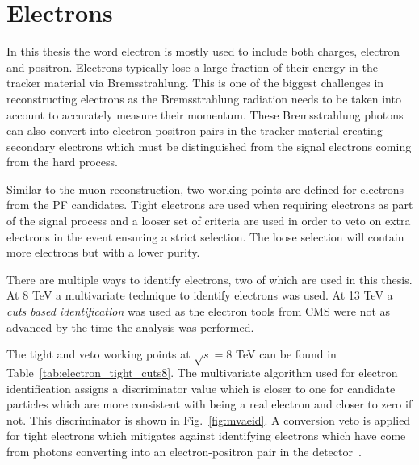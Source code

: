 \section{Electrons \label{sec:electronreco}}

In this thesis the word electron is mostly used to include both charges, electron and positron. Electrons typically lose a large fraction of their energy in the tracker material via Bremsstrahlung. This is one of the biggest challenges in reconstructing electrons as the Bremsstrahlung radiation needs to be taken into account to accurately measure their momentum. These Bremsstrahlung photons can also convert into electron-positron pairs in the tracker material creating secondary electrons which must be distinguished from the signal electrons coming from the hard process. 

Similar to the muon reconstruction, two working points are defined for electrons from the PF candidates. Tight electrons are used when requiring electrons as part of the signal process and a looser set of criteria are used in order to veto on extra electrons in the event ensuring a strict selection. The loose selection will contain more electrons but with a lower purity. 

There are multiple ways to identify electrons, two of which are used in this thesis. At 8 TeV a multivariate technique to identify electrons was used. At 13 TeV a \emph{cuts based identification} was used as the electron tools from CMS were not as advanced by the time the analysis was performed.

The tight and veto working points at $\sqrt{s}=8$ TeV can be found in Table~\ref{tab:electron_tight_cuts8}. The multivariate algorithm used for electron identification assigns a discriminator value which is closer to one for candidate particles which are more consistent with being a real electron and closer to zero if not. This discriminator is shown in Fig.~\ref{fig:mvaeid}. A conversion veto is applied for tight electrons which mitigates against identifying electrons which have come from photons converting into an electron-positron pair in the detector~\cite{Khachatryan:2015hwa}.


